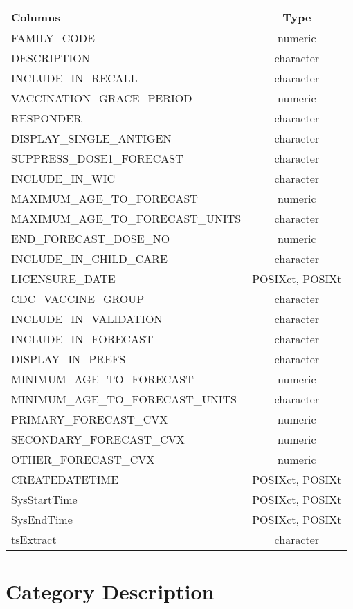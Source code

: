 \documentclass[
  letterpaper,
  DIV=11,
  numbers=noendperiod]{scrreprt}
\begin{document}
\begin{longtable}{lc}
\toprule
Columns & Type \\ 
\midrule
FAMILY\_CODE & numeric \\ 
DESCRIPTION & character \\ 
INCLUDE\_IN\_RECALL & character \\ 
VACCINATION\_GRACE\_PERIOD & numeric \\ 
RESPONDER & character \\ 
DISPLAY\_SINGLE\_ANTIGEN & character \\ 
SUPPRESS\_DOSE1\_FORECAST & character \\ 
INCLUDE\_IN\_WIC & character \\ 
MAXIMUM\_AGE\_TO\_FORECAST & numeric \\ 
MAXIMUM\_AGE\_TO\_FORECAST\_UNITS & character \\ 
END\_FORECAST\_DOSE\_NO & numeric \\ 
INCLUDE\_IN\_CHILD\_CARE & character \\ 
LICENSURE\_DATE & POSIXct, POSIXt \\ 
CDC\_VACCINE\_GROUP & character \\ 
INCLUDE\_IN\_VALIDATION & character \\ 
INCLUDE\_IN\_FORECAST & character \\ 
DISPLAY\_IN\_PREFS & character \\ 
MINIMUM\_AGE\_TO\_FORECAST & numeric \\ 
MINIMUM\_AGE\_TO\_FORECAST\_UNITS & character \\ 
PRIMARY\_FORECAST\_CVX & numeric \\ 
SECONDARY\_FORECAST\_CVX & numeric \\ 
OTHER\_FORECAST\_CVX & numeric \\ 
CREATEDATETIME & POSIXct, POSIXt \\ 
SysStartTime & POSIXct, POSIXt \\ 
SysEndTime & POSIXct, POSIXt \\ 
tsExtract & character \\ 
\bottomrule
\end{longtable}

\hypertarget{category-description-47}{%
\section*{Category Description}\label{category-description-47}}
\end{document}
